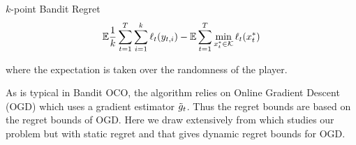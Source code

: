\begin{defn}{$k$-point Bandit Regret}
	$$\mathbb{E} \frac{1}{k} \sum_{t=1}^T \sum_{i=1}^k \ell_t(y_{t,i}) - \mathbb{E} \sum_{t=1}^T \min_{x^*_t\in \mathcal{K}}\ell_t(x^*_t)$$
	
	where the expectation is taken over the randomness of the player.
\end{defn}

As is typical in Bandit OCO, the algorithm relies on Online Gradient Descent (OGD) which uses a gradient estimator $\tilde{g}_t$. Thus the regret bounds are based on the regret bounds of OGD. Here we draw extensively from \citet{agarwal2010optimal} which studies our problem but with static regret and \citet{mokhtari2016online} that gives dynamic regret bounds for OGD.



